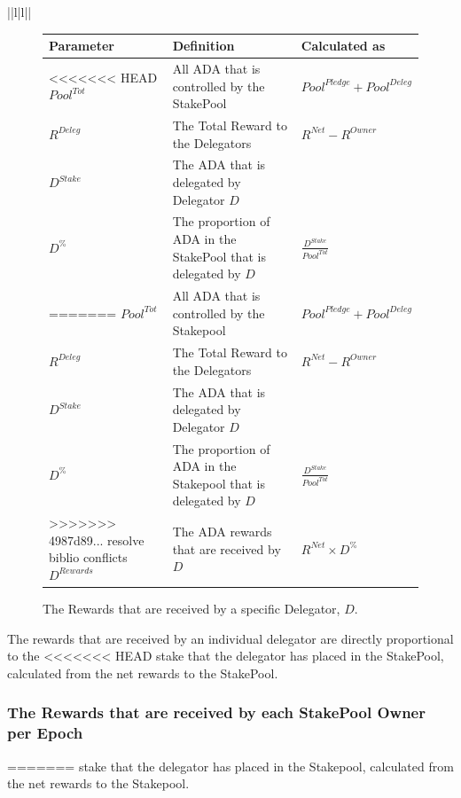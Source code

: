 \documentclass[11pt,a4paper,dvipsnames,twosided,final]{article}
\newcommand{\ada}{ADA{}}
\begin{document}
\begin{tabular}{||l|l||}
\begin{figure}[h!]
\begin{center}
\begin{tabular}{||l|p{9cm}|l||}
  \hline \hline
\textbf{Parameter} & \textbf{Definition} & \textbf{Calculated as} \\\hline
<<<<<<< HEAD
${\textit{Pool}}^{Tot}$ & All \ada{} that is controlled by the StakePool & ${\textit{Pool}}^\textit{Pledge} + {\textit{Pool}}^\textit{Deleg}$ \\\hline
$R^{Deleg}$ & The Total Reward to the Delegators & $R^{\textit{Net}} - R^\textit{Owner}$ \\\hline
$D^{Stake}$ & The \ada{} that is delegated by Delegator $D$ & \\\hline
$D^\%$ & The proportion of \ada{} in the StakePool that is delegated by $D$ & $\frac{D^{Stake}}{Pool^{Tot}}$ \\\hline
=======
${\textit{Pool}}^{Tot}$ & All \ada{} that is controlled by the Stakepool & ${\textit{Pool}}^\textit{Pledge} + {\textit{Pool}}^\textit{Deleg}$ \\\hline
$R^{Deleg}$ & The Total Reward to the Delegators & $R^{\textit{Net}} - R^\textit{Owner}$ \\\hline
$D^{Stake}$ & The \ada{} that is delegated by Delegator $D$ & \\\hline
$D^\%$ & The proportion of \ada{} in the Stakepool that is delegated by $D$ & $\frac{D^{Stake}}{Pool^{Tot}}$ \\\hline
>>>>>>> 4987d89... resolve biblio conflicts
$D^{Rewards}$ & The \ada{} rewards that are received by $D$ & $R^{\textit{Net}} \times D^\%$ \\\hline
\hline
\end{tabular}
\end{center}
\caption{The Rewards that are received by a specific Delegator, $D$.}
\end{figure}

\noindent
The rewards that are received by an individual delegator are directly proportional to the
<<<<<<< HEAD
stake that the delegator has placed in the StakePool, calculated from the net rewards to the
StakePool.

\clearpage
\subsubsection*{The Rewards that are received by each StakePool Owner per Epoch}
=======
stake that the delegator has placed in the Stakepool, calculated from the net rewards to the
Stakepool.


\end{tabular}
\end{document}

